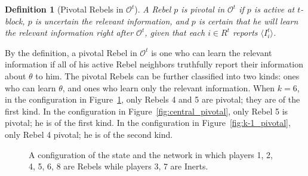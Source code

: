\documentclass[12pt,letter]{article}
\newcommand{\Omicron}{\mathcal{O}}
\newtheorem{definition}{Definition}[section]
\theoremstyle{definition}
\theoremstyle{remark}
\theoremstyle{claim}
\begin{document}
\begin{definition}[Pivotal Rebels in $\Omicron^t$]
A Rebel $p$ is pivotal in $\Omicron^t$ if $p$ is active at $t$-block, $p$ is uncertain the relevant information, and $p$ is certain that he will learn the relevant information right after $\Omicron^t$, given that each $i\in R^t$ reports $\langle I^t_i \rangle$.
\end{definition}

By the definition, a pivotal Rebel in $\Omicron^t$ is one who can learn the relevant information if all of his active Rebel neighbors truthfully report their information about $\theta$ to him. The pivotal Rebels can be further classified into two kinds: ones who can learn $\theta$, and ones who learn only the relevant information. When $k=6$, in the configuration in Figure~\ref{fig:T-round-6}, only Rebels 4 and 5 are pivotal; they are of the first kind. In the configuration in Figure~\ref{fig:central_pivotal}, only Rebel 5 is pivotal; he is of the first kind. In the configuration in Figure~\ref{fig:k-1_pivotal}, only Rebel 4 pivotal; he is of the second kind.

\begin{figure}

\begin{center}
\end{center}
\caption{A configuration of the state and the network in which players 1, 2, 4, 5, 6, 8 are Rebels while players 3, 7 are Inerts.}
\label{fig:T-round-6}
\end{figure}
\end{document}
